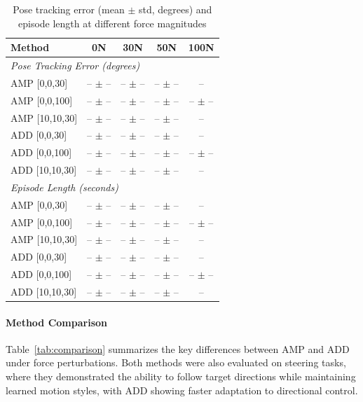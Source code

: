 \documentclass{article}
\begin{document}
\begin{table}[h]
\centering
\caption{Pose tracking error (mean $\pm$ std, degrees) and episode length at different force magnitudes}
\label{tab:pose_tracking}
\begin{tabular}{lcccc}
\toprule
\textbf{Method} & \textbf{0N} & \textbf{30N} & \textbf{50N} & \textbf{100N} \\
\midrule
\multicolumn{5}{l}{\textit{Pose Tracking Error (degrees)}} \\
AMP [0,0,30] & -- $\pm$ -- & -- $\pm$ -- & -- $\pm$ -- & -- \\
AMP [0,0,100] & -- $\pm$ -- & -- $\pm$ -- & -- $\pm$ -- & -- $\pm$ -- \\
AMP [10,10,30] & -- $\pm$ -- & -- $\pm$ -- & -- $\pm$ -- & -- \\
ADD [0,0,30] & -- $\pm$ -- & -- $\pm$ -- & -- $\pm$ -- & -- \\
ADD [0,0,100] & -- $\pm$ -- & -- $\pm$ -- & -- $\pm$ -- & -- $\pm$ -- \\
ADD [10,10,30] & -- $\pm$ -- & -- $\pm$ -- & -- $\pm$ -- & -- \\
\midrule
\multicolumn{5}{l}{\textit{Episode Length (seconds)}} \\
AMP [0,0,30] & -- $\pm$ -- & -- $\pm$ -- & -- $\pm$ -- & -- \\
AMP [0,0,100] & -- $\pm$ -- & -- $\pm$ -- & -- $\pm$ -- & -- $\pm$ -- \\
AMP [10,10,30] & -- $\pm$ -- & -- $\pm$ -- & -- $\pm$ -- & -- \\
ADD [0,0,30] & -- $\pm$ -- & -- $\pm$ -- & -- $\pm$ -- & -- \\
ADD [0,0,100] & -- $\pm$ -- & -- $\pm$ -- & -- $\pm$ -- & -- $\pm$ -- \\
ADD [10,10,30] & -- $\pm$ -- & -- $\pm$ -- & -- $\pm$ -- & -- \\
\bottomrule
\end{tabular}
\end{table}


\paragraph{Method Comparison}
Table~\ref{tab:comparison} summarizes the key differences between AMP and ADD under force perturbations. Both methods were also evaluated on steering tasks, where they demonstrated the ability to follow target directions while maintaining learned motion styles, with ADD showing faster adaptation to directional control.
\end{document}
